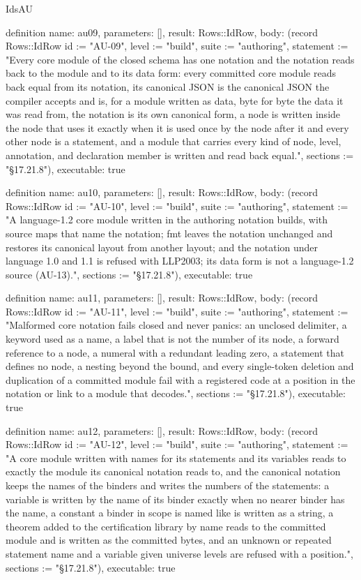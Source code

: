 \begin{lexlean}{IdsAU}
\begin{semanticmodule}
definition{
  name: au09,
  parameters: [],
  result: Rows::IdRow,
  body: (record Rows::IdRow {id := "AU-09", level := "build", suite := "authoring", statement := "Every core module of the closed schema has one notation and the notation reads back to the module and to its data form: every committed core module reads back equal from its notation, its canonical JSON is the canonical JSON the compiler accepts and is, for a module written as data, byte for byte the data it was read from, the notation is its own canonical form, a node is written inside the node that uses it exactly when it is used once by the node after it and every other node is a statement, and a module that carries every kind of node, level, annotation, and declaration member is written and read back equal.", sections := "§17.21.8"}),
  executable: true
}

definition{
  name: au10,
  parameters: [],
  result: Rows::IdRow,
  body: (record Rows::IdRow {id := "AU-10", level := "build", suite := "authoring", statement := "A language-1.2 core module written in the authoring notation builds, with source maps that name the notation; fmt leaves the notation unchanged and restores its canonical layout from another layout; and the notation under language 1.0 and 1.1 is refused with LLP2003; its data form is not a language-1.2 source (AU-13).", sections := "§17.21.8"}),
  executable: true
}

definition{
  name: au11,
  parameters: [],
  result: Rows::IdRow,
  body: (record Rows::IdRow {id := "AU-11", level := "build", suite := "authoring", statement := "Malformed core notation fails closed and never panics: an unclosed delimiter, a keyword used as a name, a label that is not the number of its node, a forward reference to a node, a numeral with a redundant leading zero, a statement that defines no node, a nesting beyond the bound, and every single-token deletion and duplication of a committed module fail with a registered code at a position in the notation or link to a module that decodes.", sections := "§17.21.8"}),
  executable: true
}

definition{
  name: au12,
  parameters: [],
  result: Rows::IdRow,
  body: (record Rows::IdRow {id := "AU-12", level := "build", suite := "authoring", statement := "A core module written with names for its statements and its variables reads to exactly the module its canonical notation reads to, and the canonical notation keeps the names of the binders and writes the numbers of the statements: a variable is written by the name of its binder exactly when no nearer binder has the name, a constant a binder in scope is named like is written as a string, a theorem added to the certification library by name reads to the committed module and is written as the committed bytes, and an unknown or repeated statement name and a variable given universe levels are refused with a position.", sections := "§17.21.8"}),
  executable: true
}


\end{semanticmodule}
\end{lexlean}
